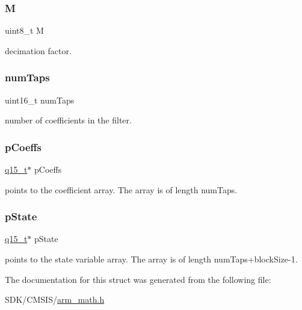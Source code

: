 \subsubsection{\texorpdfstring{M}{M}}
{\footnotesize\ttfamily uint8\+\_\+t M}

decimation factor. \mbox{\label{structarm__fir__decimate__instance__q15_a751941891e47f522a7f5375fe8990aac}} 
\subsubsection{\texorpdfstring{num\+Taps}{numTaps}}
{\footnotesize\ttfamily uint16\+\_\+t num\+Taps}

number of coefficients in the filter. \mbox{\label{structarm__fir__decimate__instance__q15_a7ca181a37f714d174445f486bebce26f}} 
\subsubsection{\texorpdfstring{p\+Coeffs}{pCoeffs}}
{\footnotesize\ttfamily \mbox{\hyperlink{arm__math_8h_ab5a8fb21a5b3b983d5f54f31614052ea}{q15\+\_\+t}}$\ast$ p\+Coeffs}

points to the coefficient array. The array is of length num\+Taps. \mbox{\label{structarm__fir__decimate__instance__q15_ae29dfdb736374fcddaeaec4b7770170c}} 
\subsubsection{\texorpdfstring{p\+State}{pState}}
{\footnotesize\ttfamily \mbox{\hyperlink{arm__math_8h_ab5a8fb21a5b3b983d5f54f31614052ea}{q15\+\_\+t}}$\ast$ p\+State}

points to the state variable array. The array is of length num\+Taps+block\+Size-\/1. 

The documentation for this struct was generated from the following file\+:\begin{DoxyCompactItemize}
\item 
S\+D\+K/\+C\+M\+S\+I\+S/\mbox{\hyperlink{arm__math_8h}{arm\+\_\+math.\+h}}\end{DoxyCompactItemize}
